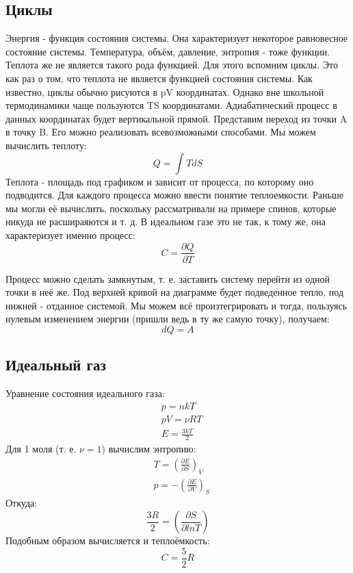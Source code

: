 \documentclass[a4paper, 12pt]{article}
\begin{document}
	\subsection{Циклы}
	Энергия - функция состояния системы. Она характеризует некоторое равновесное состояние системы. Температура, объём, давление, энтропия - тоже функции. Теплота же не является такого рода функцией. Для этого вспомним циклы. Это как раз о том, что теплота не является функцией состояния системы. Как известно, циклы обычно рисуются в pV координатах. Однако вне школьной термодинамики чаще пользуются TS координатами. Адиабатический процесс в данных координатах будет вертикальной прямой. Представим переход из точки A в точку B. Его можно реализовать всевозможными способами. Мы можем вычислить теплоту:
	\begin{equation*}
		Q = \int TdS	
	\end{equation*}
	Теплота - площадь под графиком и зависит от процесса, по которому оно подводится. Для каждого процесса можно ввести понятие теплоемкости. Раньше мы могли её вычислить, поскольку рассматривали на примере спинов, которые никуда не расшираяются и т. д.  В идеальном газе это не так, к тому же, она характеризует именно процесс: 
	\begin{equation*}
		C = \frac{\partial Q}{\partial T}
	\end{equation*}
	
	Процесс можно сделать замкнутым, т. е. заставить систему перейти из одной точки в неё же. Под верхней кривой на диаграмме будет подведенное тепло, под нижней - отданное системой. Мы можем всё произтегрировать и тогда, пользуясь нулевым изменением энергии (пришли ведь в ту же самую точку), получаем:
	\begin{equation*}
		dQ = A
	\end{equation*}
	\subsection{Идеальный газ}
	Уравнение состояния идеального газа:
	\begin{equation*}
		\begin{aligned}
			& p = nkT           \\
			& pV = \nu RT       \\
			& E = \frac{3kT}{2} 
		\end{aligned}
	\end{equation*}
	Для 1 моля (т. е. $\nu = 1$) вычислим энтропию:
	\begin{equation*}
		\begin{aligned}
			& T = (\frac{\partial E}{\partial S})_{V}  \\
			& p = -(\frac{\partial E}{\partial V})_{S} 
		\end{aligned}
	\end{equation*}
	Откуда:
	\begin{equation*}
		\frac{3R}{2} = (\frac{\partial S}{\partial lnT})
	\end{equation*}
	Подобным образом вычисляется и теплоёмкость:
	\begin{equation*}
		C = \frac{5}{2} R
	\end{equation*}
\end{document}
